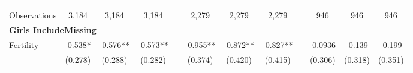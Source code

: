 \begin{landscape}
\begin{table}[htpb!]
\begin{center}
\begin{tabular}{lcccp{2mm}cccp{2mm}ccc}
\begin{footnotesize}\end{footnotesize}&\begin{footnotesize}\end{footnotesize}&\begin{footnotesize}\end{footnotesize}&\begin{footnotesize}\end{footnotesize}&\begin{footnotesize}\end{footnotesize}&\begin{footnotesize}\end{footnotesize}&\begin{footnotesize}\end{footnotesize}&\begin{footnotesize}\end{footnotesize}&\begin{footnotesize}\end{footnotesize}&\begin{footnotesize}\end{footnotesize}&\begin{footnotesize}\end{footnotesize}&\begin{footnotesize}\end{footnotesize}\\Observations&3,184&3,184&3,184&&2,279&2,279&2,279&&946&946&946\\
\multicolumn{12}{l}{\textbf{Girls IncludeMissing}}\\ 
Fertility&-0.538*&-0.576**&-0.573**&&-0.955**&-0.872**&-0.827**&&-0.0936&-0.139&-0.199\\
&(0.278)&(0.288)&(0.282)&&(0.374)&(0.420)&(0.415)&&(0.306)&(0.318)&(0.351)\\

\end{tabular}
\end{center}
\end{table}
\end{landscape}
